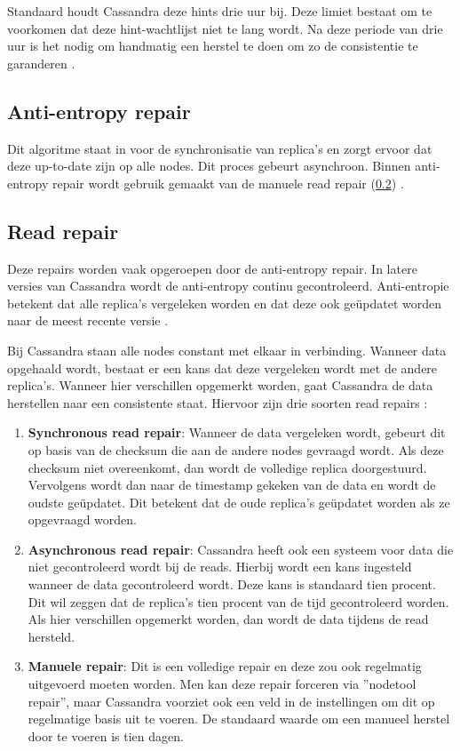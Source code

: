 Standaard houdt Cassandra deze hints drie uur bij.
Deze limiet bestaat om te voorkomen dat deze hint-wachtlijst niet te lang wordt.
Na deze periode van drie uur is het nodig om handmatig een herstel te doen om zo de consistentie te garanderen \citep{strickland2014availability}.

\subsection{Anti-entropy repair}
Dit algoritme staat in voor de synchronisatie van replica's en zorgt ervoor dat deze up-to-date zijn op alle nodes.
Dit proces gebeurt asynchroon.
Binnen anti-entropy repair wordt gebruik gemaakt van de manuele read repair (\ref{sec:read_repair}) \citep{strickland2014availability}.

\subsection{Read repair}
\label{sec:read_repair}
Deze repairs worden vaak opgeroepen door de anti-entropy repair.
In latere versies van Cassandra wordt de anti-entropy continu gecontroleerd.
Anti-entropie betekent dat alle replica's vergeleken worden en dat deze ook geüpdatet worden naar de meest recente versie \citep{Kunz2013Entropy}.

Bij Cassandra staan alle nodes constant met elkaar in verbinding.
Wanneer data opgehaald wordt, bestaat er een kans dat deze vergeleken wordt met de andere replica's.
Wanneer hier verschillen opgemerkt worden, gaat Cassandra de data herstellen naar een consistente staat.
Hiervoor zijn drie soorten read repairs \citep{strickland2014availability}:

\begin{enumerate}
	\item \textbf{Synchronous read repair}:
	Wanneer de data vergeleken wordt, gebeurt dit op basis van de checksum die aan de andere nodes gevraagd wordt.
	Als deze checksum niet overeenkomt, dan wordt de volledige replica doorgestuurd.
	Vervolgens wordt dan naar de timestamp gekeken van de data en wordt de oudste geüpdatet.
	Dit betekent dat de oude replica's geüpdatet worden als ze opgevraagd worden.
	
	\item \textbf{Asynchronous read repair}:
	Cassandra heeft ook een systeem voor data die niet gecontroleerd wordt bij de reads.
	Hierbij wordt een kans ingesteld wanneer de data gecontroleerd wordt.
	Deze kans is standaard tien procent.
	Dit wil zeggen dat de replica's tien procent van de tijd gecontroleerd worden.
	Als hier verschillen opgemerkt worden, dan wordt de data tijdens de read hersteld.
	
	\item \textbf{Manuele repair}:
	Dit is een volledige repair en deze zou ook regelmatig uitgevoerd moeten worden.
	Men kan deze repair forceren via ''nodetool repair'', maar Cassandra voorziet ook een veld in de instellingen om dit op regelmatige basis uit te voeren.
	De standaard waarde om een manueel herstel door te voeren is tien dagen.
\end{enumerate}

